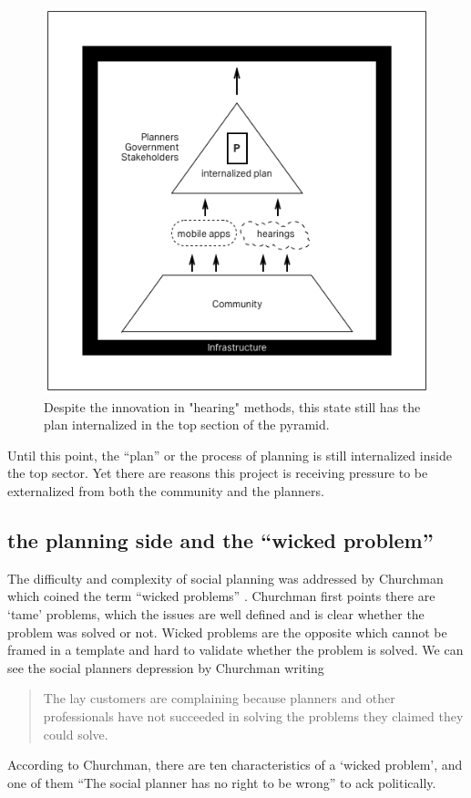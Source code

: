 \begin{figure}[!htb]
  \includegraphics[width=\textwidth]{chapters/2/fig/internalized_plan.png}               
  \caption[diagram: unstructured app]{Despite the innovation in "hearing" methods, this state still has the plan internalized in the top section of the pyramid.}
  \label{fig:internalized_plan}
\end{figure}


Until this point, the ``plan'' or the process of planning is still internalized inside the top sector. Yet there are reasons this project is receiving pressure to be externalized from both the community and the planners.

\subsection{the planning side and the ``wicked
problem''}\label{subsec:wicked}

The difficulty and complexity of social planning was addressed by Churchman
which coined the term ``wicked problems'' \cite{churchman1967guest}.
Churchman first points there are `tame' problems, which the issues are well
defined and is clear whether the problem was solved or not. Wicked problems
are the opposite which cannot be framed in a template and hard to
validate whether the problem is solved.
We can see the social planners depression by Churchman writing 
\begin{quotation}
  The lay customers are complaining because planners and other professionals have not
  succeeded in solving the problems they claimed they could solve.
\end{quotation}
According to Churchman, there are ten characteristics of a `wicked
problem', and one of them ``The social planner has no right to be wrong''
to ack politically.

